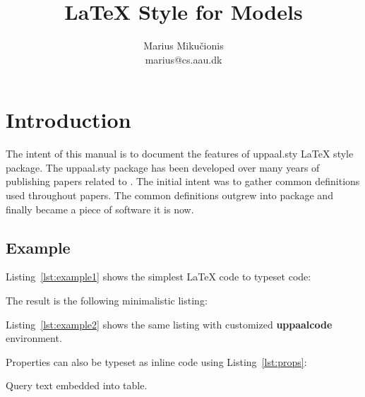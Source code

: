 \documentclass[english,paper=a4,final]{article}
\title{\LaTeX{} Style for \uppaal Models}
\author{Marius Miku\v{c}ionis \\ {\ttfamily marius@cs.aau.dk}}
\begin{document}
\maketitle


\section{Introduction}
The intent of this manual is to document the features of {\ttfamily uppaal.sty} \LaTeX{} style package.
The {\ttfamily uppaal.sty} package has been developed over many years of publishing papers related to \uppaal.
The initial intent was to gather common definitions used throughout papers.
The common definitions outgrew into package and finally became a piece of software it is now.

\subsection{Example}
Listing~\ref{lst:example1} shows the simplest \LaTeX{} code to typeset \uppaal code:



The result is the following minimalistic listing:


Listing~\ref{lst:example2} shows the same listing with customized {\bfseries uppaalcode} environment.






Properties can also be typeset as inline code using Listing~\ref{lst:props}:\\
\begin{table}
  \centering
  \caption{Query text embedded into table.}
  
\end{table}


\end{document}
